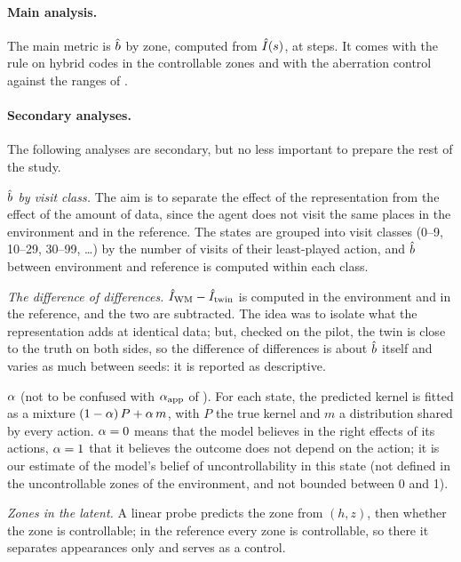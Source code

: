 \documentclass[10pt]{article}
\begin{document}
\paragraph{Main analysis.}
The main metric is $\hat{b}$ by zone, computed from $\hat{I}(s)$, at \eThreeBudget{} steps.
It comes with the rule on hybrid codes in the controllable zones and with the aberration control against the ranges of
\EThreeZero.

\paragraph{Secondary analyses.}
The following analyses are secondary, but no less important to prepare the rest of the study.

\emph{$\hat{b}$ by visit class.} The aim is to separate the effect of the representation from the effect of the amount of
data, since the agent does not visit the same places in the environment and in the reference.
The states are grouped into visit classes (0--9, 10--29, 30--99, \ldots) by the number of visits of their least-played %
action, and $\hat{b}$ between environment and reference is computed within each class.

\emph{The difference of differences.} $\hat{I}_{\mathrm{WM}} - \hat{I}_{\mathrm{twin}}$ is computed in the environment and in
the reference, and the two are subtracted.
The idea was to isolate what the representation adds at identical data; but, checked on the pilot, the twin is close to
the truth on both sides, so the difference of differences is about $\hat{b}$ itself and varies as much between seeds: it is
reported as descriptive.

\emph{$\alpha$} (not to be confused with $\alpha_{\mathrm{app}}$ of \DOne). For each state, the predicted kernel is fitted as a
mixture $(1 - \alpha)\,P + \alpha\, m$, with $P$ the true kernel and $m$ a distribution shared by every action. %
$\alpha = 0$ means that the model believes in the right effects of its actions, $\alpha = 1$ that it believes the %
outcome does not depend on the action; it is our estimate of the model's belief of uncontrollability in this state (not
defined in the uncontrollable zones of the environment, and not bounded between 0 and 1). %

\emph{Zones in the latent.} A linear probe predicts the zone from $(h, z)$, then whether the zone is controllable; in the
reference every zone is controllable, so there it separates appearances only and serves as a control.
\end{document}
